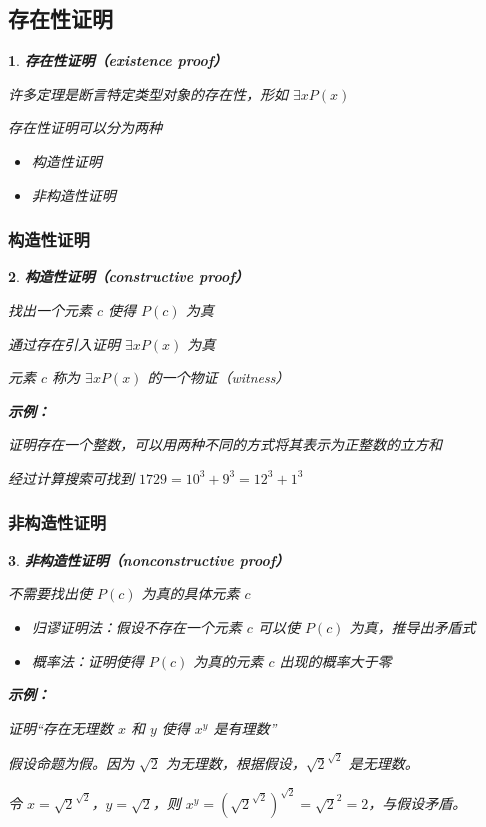 \documentclass[UTF8]{report}
\theoremstyle{MyLineTheoremStyle} %
\theoremstyle{MyBlockTheoremStyle} %
\theoremstyle{MySubsubsectionStyle} %
\newtheorem{definition}{}
\begin{document}
\subsection{存在性证明}

\begin{definition}
    \textbf{存在性证明（existence proof）}\par
    许多定理是断言特定类型对象的存在性，形如 $\exists x P(x)$\par
    存在性证明可以分为两种\par
    \begin{itemize}
        \item 构造性证明
        \item 非构造性证明
    \end{itemize}
\end{definition}

\subsubsection{构造性证明}

\begin{definition}
    \textbf{构造性证明（constructive proof）}\par
    找出一个元素 $c$ 使得 $P(c)$ 为真\par
    通过存在引入证明 $\exists x P(x)$ 为真\par
    元素 $c$ 称为 $\exists x P(x)$ 的一个物证（witness）\par

    \textbf{示例：}\par
    证明存在一个整数，可以用两种不同的方式将其表示为正整数的立方和\par
    经过计算搜索可找到 $1729 = 10^3 + 9^3 = 12^3 + 1^3$\par
\end{definition}

\subsubsection{非构造性证明}

\begin{definition}
    \textbf{非构造性证明（nonconstructive proof）}\par
    不需要找出使 $P(c)$ 为真的具体元素 $c$\par
    \begin{itemize}
        \item 归谬证明法：假设不存在一个元素 $c$ 可以使 $P(c)$ 为真，推导出矛盾式
        \item 概率法：证明使得 $P(c)$ 为真的元素 $c$ 出现的概率大于零
    \end{itemize}

    \textbf{示例：}\par
    证明“存在无理数 $x$ 和 $y$ 使得 $x^y$ 是有理数”\par
    假设命题为假。因为 $\sqrt{2}$ 为无理数，根据假设，$\sqrt{2}^{\sqrt{2}}$ 是无理数。\par
    令 $x = \sqrt{2}^{\sqrt{2}}$，$y = \sqrt{2}$，则 $x^y = (\sqrt{2}^{\sqrt{2}})^{\sqrt{2}} = \sqrt{2}^2 = 2$，与假设矛盾。\par
\end{definition}
\end{document}
